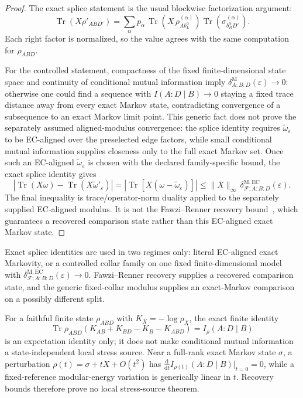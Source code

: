 \documentclass[11pt]{article}
\theoremstyle{remark}
\theoremstyle{plain}
\begin{document}
\begin{proof}
The exact splice statement is the usual blockwise factorization argument:
\[
\operatorname{Tr}(X\rho'_{AB D'})
=
\sum_\alpha
p_\alpha\,
\operatorname{Tr}\!\left(
X\, \rho^{(\alpha)}_{A b_L^\alpha}
\right)
\operatorname{Tr}\!\left(\sigma_{b_R^\alpha D'}^{(\alpha)}\right).
\]
Each right factor is normalized, so the value agrees with the same computation for \(\rho_{ABD}\).

For the controlled statement, compactness of the fixed finite-dimensional state space and continuity of conditional mutual information imply \(\delta^{\mathrm M}_{A:B:D}(\varepsilon)\to0\): otherwise one could find a sequence with \(I(A:D\mid B)\to0\) staying a fixed trace distance away from every exact Markov state, contradicting convergence of a subsequence to an exact Markov limit point. This generic fact does not prove the separately assumed aligned-modulus convergence: the splice identity requires \(\widetilde\omega_\varepsilon\) to be EC-aligned over the preselected edge factors, while small conditional mutual information supplies closeness only to the full exact Markov set. Once such an EC-aligned \(\widetilde\omega_\varepsilon\) is chosen with the declared family-specific bound, the exact splice identity gives
\[
\left|
\operatorname{Tr}(X\omega)-\operatorname{Tr}(X\widetilde\omega'_\varepsilon)
\right|
=
\left|
\operatorname{Tr}\!\left[X(\omega-\widetilde\omega_\varepsilon)\right]
\right|
\le
\|X\|_\infty\,
\delta^{\mathrm{M,EC}}_{\mathcal F;A:B:D}(\varepsilon).
\]
The final inequality is trace/operator-norm duality applied to the separately supplied EC-aligned modulus. It is not the Fawzi--Renner recovery bound~\cite{fawziRenner15}, which guarantees a recovered comparison state rather than this EC-aligned exact Markov state.
\end{proof}

Exact splice identities are used in two regimes only: literal EC-aligned
exact Markovity, or a controlled collar family on one fixed
finite-dimensional model with
\(\delta^{\mathrm{M,EC}}_{\mathcal F;A:B:D}(\varepsilon)\to0\). Fawzi--Renner
recovery supplies a recovered comparison state, and the generic fixed-collar
modulus supplies an exact-Markov comparison on a possibly different split.

For a faithful finite state \(\rho_{ABD}\) with \(K_X=-\log\rho_X\), the
exact finite identity
\[
  \operatorname{Tr}\rho_{ABD}(K_{AB}+K_{BD}-K_B-K_{ABD})
  =
  I_\rho(A:D\mid B)
\]
is an expectation identity only; it does not make conditional mutual
information a state-independent local stress source. Near a full-rank exact
Markov state \(\sigma\), a perturbation \(\rho(t)=\sigma+tX+O(t^2)\) has
\(\frac{\mathrm d}{\mathrm d t}I_{\rho(t)}(A:D\mid B)|_{t=0}=0\), while a
fixed-reference modular-energy variation is generically linear in \(t\).
Recovery bounds therefore prove no local stress-source theorem.
\end{document}
